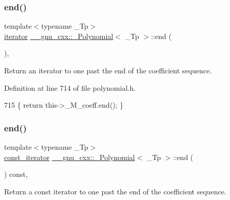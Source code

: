 \subsubsection{\texorpdfstring{end()}{end()}\hspace{0.1cm}{\footnotesize\ttfamily [1/2]}}
{\footnotesize\ttfamily template$<$typename \+\_\+\+Tp$>$ \\
\hyperlink{class____gnu__cxx_1_1__Polynomial_a64bd557b6af46992e352dbe9e30fa201}{iterator} \hyperlink{class____gnu__cxx_1_1__Polynomial}{\+\_\+\+\_\+gnu\+\_\+cxx\+::\+\_\+\+Polynomial}$<$ \+\_\+\+Tp $>$\+::end (\begin{DoxyParamCaption}{ }\end{DoxyParamCaption})\hspace{0.3cm}{\ttfamily [inline]}, {\ttfamily [noexcept]}}

Return an iterator to one past the end of the coefficient sequence. 

Definition at line 714 of file polynomial.\+h.


\begin{DoxyCode}
715       \{ \textcolor{keywordflow}{return} this->\_M\_coeff.end(); \}
\end{DoxyCode}
\mbox{\label{class____gnu__cxx_1_1__Polynomial_a3f971eb02150e9ca66e8222ba4a5aa3d}} 
\subsubsection{\texorpdfstring{end()}{end()}\hspace{0.1cm}{\footnotesize\ttfamily [2/2]}}
{\footnotesize\ttfamily template$<$typename \+\_\+\+Tp$>$ \\
\hyperlink{class____gnu__cxx_1_1__Polynomial_a96e4523cc2a834724fe4224f0800486b}{const\+\_\+iterator} \hyperlink{class____gnu__cxx_1_1__Polynomial}{\+\_\+\+\_\+gnu\+\_\+cxx\+::\+\_\+\+Polynomial}$<$ \+\_\+\+Tp $>$\+::end (\begin{DoxyParamCaption}{ }\end{DoxyParamCaption}) const\hspace{0.3cm}{\ttfamily [inline]}, {\ttfamily [noexcept]}}

Return a {\ttfamily const} iterator to one past the end of the coefficient sequence. 

